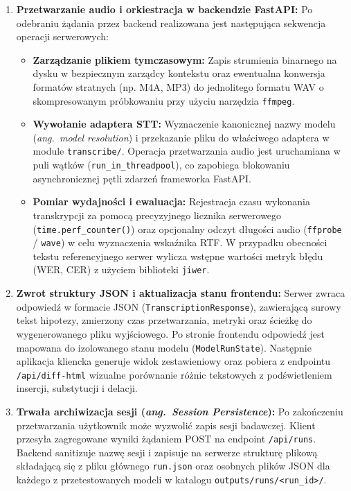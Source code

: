 \begin{enumerate}
    \item \textbf{Przetwarzanie audio i orkiestracja w backendzie FastAPI:}
    Po odebraniu żądania przez backend realizowana jest następująca sekwencja operacji serwerowych:
    \begin{itemize}
        \item \textbf{Zarządzanie plikiem tymczasowym:} Zapis strumienia binarnego na dysku w bezpiecznym zarządcy kontekstu oraz ewentualna konwersja formatów stratnych (np. M4A, MP3) do jednolitego formatu WAV o skompresowanym próbkowaniu przy użyciu narzędzia \texttt{ffmpeg}.
        \item \textbf{Wywołanie adaptera STT:} Wyznaczenie kanonicznej nazwy modelu (\textit{ang.~model resolution}) i przekazanie pliku do właściwego adaptera w module \texttt{transcribe/}. Operacja przetwarzania audio jest uruchamiana w puli wątków (\texttt{run\_in\_}\linebreak\texttt{threadpool}), co zapobiega blokowaniu asynchronicznej pętli zdarzeń frameworka FastAPI.
        \item \textbf{Pomiar wydajności i ewaluacja:} Rejestracja czasu wykonania transkrypcji za pomocą precyzyjnego licznika serwerowego (\texttt{time.perf\_counter()}) oraz opcjonalny odczyt długości audio (\texttt{ffprobe} / \texttt{wave}) w celu wyznaczenia wskaźnika RTF. W przypadku obecności tekstu referencyjnego serwer wylicza wstępne wartości metryk błędu (WER, CER) z użyciem biblioteki \texttt{jiwer}.
    \end{itemize}

    \item \textbf{Zwrot struktury JSON i aktualizacja stanu frontendu:}
    Serwer zwraca odpowiedź w formacie JSON (\texttt{TranscriptionResponse}), zawierającą surowy tekst hipotezy, zmierzony czas przetwarzania, metryki oraz ścieżkę do wygenerowanego pliku wyjściowego. Po stronie frontendu odpowiedź jest mapowana do izolowanego stanu modelu (\texttt{ModelRunState}). Następnie aplikacja kliencka generuje widok zestawieniowy oraz pobiera z endpointu \texttt{/api/diff-html} wizualne porównanie różnic tekstowych z podświetleniem insercji, substytucji i delacji.

    \item \textbf{Trwała archiwizacja sesji (\textit{ang.~Session Persistence}):}
    Po zakończeniu przetwarzania użytkownik może wyzwolić zapis sesji badawczej. Klient przesyła zagregowane wyniki żądaniem POST na endpoint \texttt{/api/runs}. Backend sanitizuje nazwę sesji i zapisuje na serwerze strukturę plikową składającą się z pliku głównego \texttt{run.json} oraz osobnych plików JSON dla każdego z przetestowanych modeli w katalogu \texttt{outputs/runs/<run\_id>/}.

\end{enumerate}

